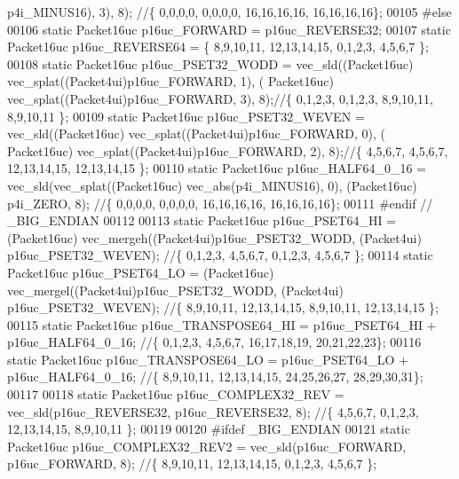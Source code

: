 \begin{DoxyCode}
      p4i\_MINUS16), 3), 8);      \textcolor{comment}{//\{ 0,0,0,0, 0,0,0,0, 16,16,16,16, 16,16,16,16\};}
00105 \textcolor{preprocessor}{#else}
00106 \textcolor{keyword}{static} Packet16uc p16uc\_FORWARD = p16uc\_REVERSE32; 
00107 \textcolor{keyword}{static} Packet16uc p16uc\_REVERSE64 = \{ 8,9,10,11, 12,13,14,15, 0,1,2,3, 4,5,6,7 \};
00108 \textcolor{keyword}{static} Packet16uc p16uc\_PSET32\_WODD = vec\_sld((Packet16uc) vec\_splat((Packet4ui)p16uc\_FORWARD, 1), (
      Packet16uc) vec\_splat((Packet4ui)p16uc\_FORWARD, 3), 8);\textcolor{comment}{//\{ 0,1,2,3, 0,1,2,3, 8,9,10,11, 8,9,10,11 \};}
00109 \textcolor{keyword}{static} Packet16uc p16uc\_PSET32\_WEVEN = vec\_sld((Packet16uc) vec\_splat((Packet4ui)p16uc\_FORWARD, 0), (
      Packet16uc) vec\_splat((Packet4ui)p16uc\_FORWARD, 2), 8);\textcolor{comment}{//\{ 4,5,6,7, 4,5,6,7, 12,13,14,15, 12,13,14,15 \};}
00110 \textcolor{keyword}{static} Packet16uc p16uc\_HALF64\_0\_16 = vec\_sld(vec\_splat((Packet16uc) vec\_abs(p4i\_MINUS16), 0), (Packet16uc)
      p4i\_ZERO, 8);      \textcolor{comment}{//\{ 0,0,0,0, 0,0,0,0, 16,16,16,16, 16,16,16,16\};}
00111 \textcolor{preprocessor}{#endif // \_BIG\_ENDIAN}
00112 
00113 \textcolor{keyword}{static} Packet16uc p16uc\_PSET64\_HI = (Packet16uc) vec\_mergeh((Packet4ui)p16uc\_PSET32\_WODD, (Packet4ui)
      p16uc\_PSET32\_WEVEN);     \textcolor{comment}{//\{ 0,1,2,3, 4,5,6,7, 0,1,2,3, 4,5,6,7 \};}
00114 \textcolor{keyword}{static} Packet16uc p16uc\_PSET64\_LO = (Packet16uc) vec\_mergel((Packet4ui)p16uc\_PSET32\_WODD, (Packet4ui)
      p16uc\_PSET32\_WEVEN);     \textcolor{comment}{//\{ 8,9,10,11, 12,13,14,15, 8,9,10,11, 12,13,14,15 \};}
00115 \textcolor{keyword}{static} Packet16uc p16uc\_TRANSPOSE64\_HI = p16uc\_PSET64\_HI + p16uc\_HALF64\_0\_16;                              
                 \textcolor{comment}{//\{ 0,1,2,3, 4,5,6,7, 16,17,18,19, 20,21,22,23\};}
00116 \textcolor{keyword}{static} Packet16uc p16uc\_TRANSPOSE64\_LO = p16uc\_PSET64\_LO + p16uc\_HALF64\_0\_16;                              
                 \textcolor{comment}{//\{ 8,9,10,11, 12,13,14,15, 24,25,26,27, 28,29,30,31\};}
00117 
00118 \textcolor{keyword}{static} Packet16uc p16uc\_COMPLEX32\_REV = vec\_sld(p16uc\_REVERSE32, p16uc\_REVERSE32, 8);                      
                         \textcolor{comment}{//\{ 4,5,6,7, 0,1,2,3, 12,13,14,15, 8,9,10,11 \};}
00119 
00120 \textcolor{preprocessor}{#ifdef \_BIG\_ENDIAN}
00121 \textcolor{keyword}{static} Packet16uc p16uc\_COMPLEX32\_REV2 = vec\_sld(p16uc\_FORWARD, p16uc\_FORWARD, 8);                         
                         \textcolor{comment}{//\{ 8,9,10,11, 12,13,14,15, 0,1,2,3, 4,5,6,7 \};}

\end{DoxyCode}

